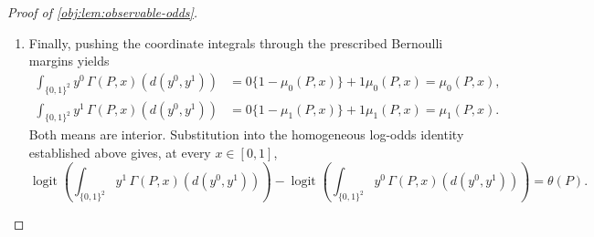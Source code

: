 \begin{proof}[Proof of \cref{obj:lem:observable-odds}]
\begin{enumerate}
\item Finally, pushing the coordinate integrals through the prescribed Bernoulli margins yields
\[
\begin{aligned}
\int_{\{0,1\}^2}y^0\,\Gamma(P,x)(d(y^0,y^1))
&=0\{1-\mu_0(P,x)\}+1\mu_0(P,x)=\mu_0(P,x),\\
\int_{\{0,1\}^2}y^1\,\Gamma(P,x)(d(y^0,y^1))
&=0\{1-\mu_1(P,x)\}+1\mu_1(P,x)=\mu_1(P,x).
\end{aligned}
\]
Both means are interior. Substitution into the homogeneous log-odds identity established above gives, at every \(x\in[0,1]\),
\[
\operatorname{logit}
 \left(\int_{\{0,1\}^2}y^1\,\Gamma(P,x)(d(y^0,y^1))\right)
-
\operatorname{logit}
 \left(\int_{\{0,1\}^2}y^0\,\Gamma(P,x)(d(y^0,y^1))\right)
=\theta(P).
\]
\end{enumerate}
\end{proof}
